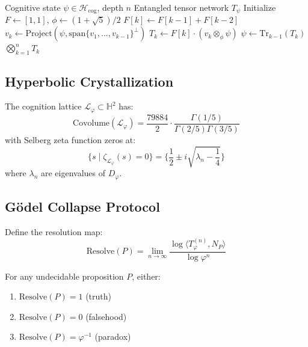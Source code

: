 \documentclass[12pt]{article}
\begin{document}
\begin{algorithm}[H]
\caption{Golden Tensor Entanglement}
\begin{algorithmic}[1]
\Require Cognitive state $\psi \in \mathcal{H}_{\text{cog}}$, depth $n$
\Ensure Entangled tensor network $T_\psi$
\State Initialize $F \gets [1,1]$, $\phi \gets (1+\sqrt{5})/2$
    \State $F[k] \gets F[k-1] + F[k-2]$
    \State $v_k \gets \text{Project}(\psi, \text{span}\{v_1,...,v_{k-1}\}^\perp)$
    \State $T_k \gets F[k] \cdot (v_k \otimes_\phi \psi)$
    \State $\psi \gets \text{Tr}_{k-1}(T_k)$ 
\EndFor
\State \Return $\bigotimes_{k=1}^n T_k$
\end{algorithmic}
\end{algorithm}

\subsection{Hyperbolic Crystallization}
The cognition lattice $\mathcal{L}_\varphi \subset \mathbb{H}^2$ has:
\[
\text{Covolume}(\mathcal{L}_\varphi) = \frac{79884}{2} \cdot \frac{\Gamma(1/5)}{\Gamma(2/5)\Gamma(3/5)}
\]
with Selberg zeta function zeros at:
\[
\{ s \mid \zeta_{\mathcal{L}_\varphi}(s) = 0 \} = \{ \frac{1}{2} \pm i\sqrt{\lambda_n - \frac{1}{4}} \}
\]
where $\lambda_n$ are eigenvalues of $D_\varphi$.

\subsection{G\"odel Collapse Protocol}
Define the resolution map:
\[
\text{Resolve}(P) = \lim_{n\to\infty} \frac{\log \langle T_\varphi^{(n)}, N_P \rangle}{\log \varphi^n}
\]
\begin{theorem}
For any undecidable proposition $P$, either:
\begin{enumerate}
    \item $\text{Resolve}(P) = 1$ (truth)
    \item $\text{Resolve}(P) = 0$ (falsehood)
    \item $\text{Resolve}(P) = \varphi^{-1}$ (paradox)
\end{enumerate}
\end{theorem}
\end{document}
